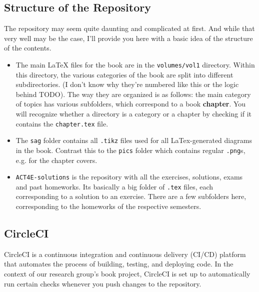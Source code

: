 \documentclass{article}
\begin{document}
\subsection{Structure of the Repository}
The repository may seem quite daunting and complicated at first. And while that very well may be the case, I'll provide you here with a basic idea of the structure of the contents.
\begin{itemize}
\item The main LaTeX files for the book are in the \texttt{volumes/vol1} directory. Within this directory, the various categories of the book are split into different subdirectories. (I don't know why they're numbered like this or the logic behind TODO). The way they are organized is as follows: the main category of topics has various subfolders, which correspond to a book \textbf{chapter}. You will recognize whether a directory is a category or a chapter by checking if it contains the \texttt{chapter.tex} file.
\item The \texttt{sag} folder contains all \texttt{.tikz} files used for all LaTex-generated diagrams in the book. Contrast this to the \texttt{pics} folder which contains regular \texttt{.png}s, e.g. for the chapter covers.
\item \texttt{ACT4E-solutions} is the repository with all the exercises, solutions, exams and past homeworks. Its basically a big folder of \texttt{.tex} files, each corresponding to a solution to an exercise. There are a few subfolders here, corresponding to the homeworks of the respective semesters.
\end{itemize}

\subsection{CircleCI}


CircleCI is a continuous integration and continuous delivery (CI/CD) platform that automates the process of building, testing, and deploying code. In the context of our research group's book project, CircleCI is set up to automatically run certain checks whenever you push changes to the repository.
\end{document}
